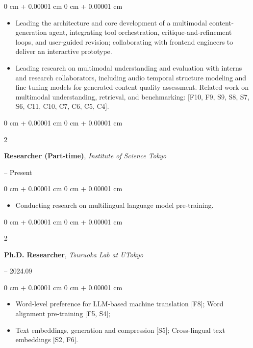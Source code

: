 \documentclass[10pt, letterpaper]{article}
\newenvironment{highlights}{
    \begin{itemize}[
        topsep=0.10 cm,
        parsep=0.10 cm,
        partopsep=0pt,
        itemsep=0pt,
        leftmargin=0 cm + 10pt
    ]
}{
    \end{itemize}
} %
\newenvironment{onecolentry}{
    \begin{adjustwidth}{
        0 cm + 0.00001 cm
    }{
        0 cm + 0.00001 cm
    }
}{
    \end{adjustwidth}
} %
\newenvironment{twocolentry}[2][]{
    \onecolentry
    \def\secondColumn{#2}
    \setcolumnwidth{\fill, 4.5 cm}
    \begin{paracol}{2}
}{
    \switchcolumn \raggedleft \secondColumn
    \end{paracol}
    \endonecolentry
} %
\begin{document}
        \begin{onecolentry}
            \begin{highlights}
                \item Leading the architecture and core development of a multimodal content-generation agent, integrating tool orchestration, critique-and-refinement loops, and user-guided revision; collaborating with frontend engineers to deliver an interactive prototype.
                \item Leading research on multimodal understanding and evaluation with interns and research collaborators, including audio temporal structure modeling and fine-tuning models for generated-content quality assessment. Related work on multimodal understanding, retrieval, and benchmarking: \textnormal{[F10, F9, S9, S8, S7, S6, C11, C10, C7, C6, C5, C4]}.
            \end{highlights}
        \end{onecolentry}
        \vspace{0.10 cm}
        
        \begin{twocolentry}{2026.11 -- Present}
        \textbf{Researcher (Part-time)}, \textit{Institute of Science Tokyo}
        \end{twocolentry}
        \vspace{0.10 cm}

        \begin{onecolentry}
            \begin{highlights}
                \item Conducting research on multilingual language model pre-training.
            \end{highlights}
        \end{onecolentry}
        \vspace{0.10 cm}

        \begin{twocolentry}{2021.10 -- 2024.09}
        \textbf{Ph.D. Researcher}, \textit{Tsuruoka Lab at UTokyo}
        \end{twocolentry}
        \vspace{0.10 cm}
        
        \begin{onecolentry}
            \begin{highlights}
                \item Word-level preference for LLM-based machine translation [F8]; Word alignment pre-training [F5, S4];
                \item Text embeddings, generation and compression [S5]; Cross-lingual text embeddings [S2, F6].
            \end{highlights}
        \end{onecolentry}
        \vspace{0.10 cm}
\end{document}
